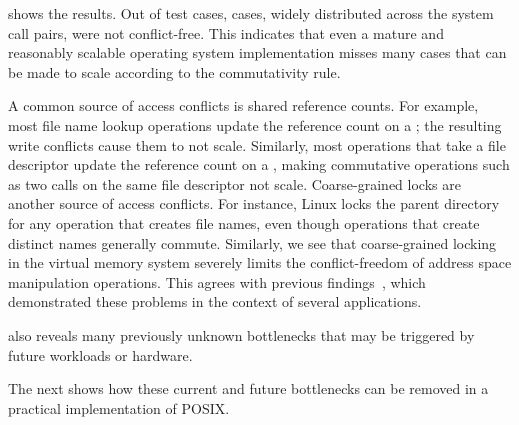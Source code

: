  shows the results.
Out of  test cases,
 cases, widely distributed across the
system call pairs, were not conflict-free.
This indicates that even a mature and reasonably scalable operating system
implementation misses many cases that can be made to scale according
to the commutativity rule.

A common source of access conflicts is shared reference counts.
%
For example, most file name lookup operations update the reference
count on a ; the resulting write conflicts cause
them to not scale.
%
Similarly, most operations that take a file descriptor update the
reference count on a , making
commutative operations such as two  calls on the
same file descriptor not scale.
Coarse-grained locks are another source of access conflicts.  For
instance, Linux locks the parent directory for any operation that
creates file names, even though operations that create distinct names
generally commute.
%
%
Similarly, we see that coarse-grained locking in the virtual memory
system severely limits the conflict-freedom of address space manipulation
operations. This agrees with previous
findings~\cite{boyd-wickizer:scaling,clements:radixvm,clements:bonsai},
which demonstrated these problems in the context of several applications.

 also reveals many previously
unknown bottlenecks that may be triggered by future workloads or
hardware.

The next  shows how these current and future
bottlenecks can be removed in a practical implementation of POSIX.



